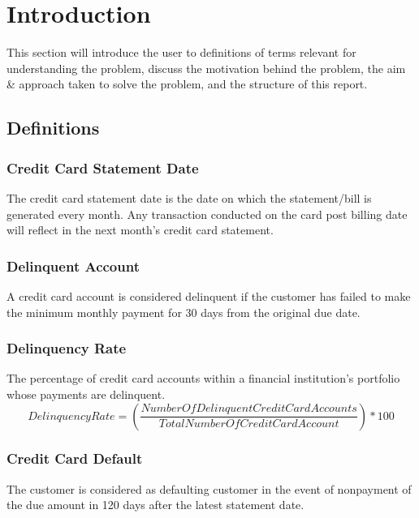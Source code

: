 \documentclass[twoside,11pt,a4paper]{article}
\begin{document}
\section{Introduction}

This section will introduce the user to definitions of terms relevant for understanding the problem, discuss the motivation behind the problem, the aim \& approach taken to solve the problem, and the structure of this report. 


\subsection{Definitions}

\subsubsection{Credit Card Statement Date}
The credit card statement date is the date on which the statement/bill is generated every month. Any transaction conducted on the card post billing date will reflect in the next month's credit card statement.

\subsubsection{Delinquent Account}
A credit card account is considered delinquent if the customer has failed to make the minimum monthly payment for 30 days from the original due date.

\subsubsection{Delinquency Rate}
The percentage of credit card accounts within a financial institution's portfolio whose payments are delinquent.
\begin{equation}
	Delinquency Rate = \left(\frac{Number Of Delinquent Credit Card Accounts}{Total Number Of Credit Card Account}\right) * 100
\end{equation}

\subsubsection{Credit Card Default}
The customer is considered as defaulting customer in the event of nonpayment of the due amount in 120 days after the latest statement date.
\end{document}
